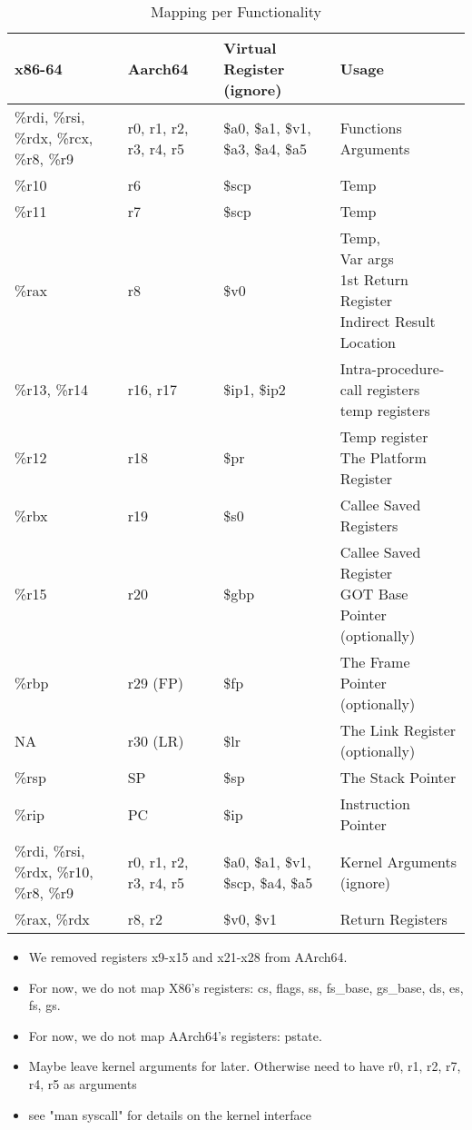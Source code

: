 \documentclass[11pt]{article}
\begin{document}
\begin{table}[ht]
\caption{Mapping per Functionality}
\begin{adjustwidth}{-4.3cm}{-4.3cm}
\begin{tabular}{|l|l|l|l|}
    \hline
    \textbf{x86-64} & \textbf{Aarch64} & \textbf{Virtual Register (ignore)} & \textbf{Usage} \\
    \hline
    \%rdi, \%rsi, \%rdx, \%rcx, \%r8, \%r9 & r0, r1, r2, r3, r4, r5 & \$a0, \$a1, \$v1, \$a3, \$a4, \$a5 & Functions Arguments \\
    \hline
    \%r10 & r6 & \$scp & Temp \\
    \hline
    \%r11 & r7 & \$scp & Temp \\
    \hline
    \%rax & r8 & \$v0 & \pbox{20cm}{Temp, \\  Var args \\ 1st Return Register \\ Indirect Result Location} \\
    \hline
    \%r13, \%r14 & r16, r17 & \$ip1, \$ip2 & \pbox{20cm}{Intra-procedure-call registers \\ temp registers} \\
    \hline
    \%r12 & r18 & \$pr & \pbox{20cm}{Temp register \\ The Platform Register} \\
    \hline
    \%rbx & r19 & \$s0 & Callee Saved Registers \\
    \hline
    \%r15 & r20 & \$gbp & \pbox{20cm}{Callee Saved Register \\ GOT Base Pointer (optionally)} \\
    \hline
    \%rbp & r29 (FP) & \$fp & The Frame Pointer (optionally) \\
    \hline
    NA & r30 (LR) & \$lr & The Link Register (optionally) \\
    \hline
    \%rsp & SP & \$sp & The Stack Pointer \\
    \hline
    \%rip & PC & \$ip & Instruction Pointer \\
    \hline
    \%rdi, \%rsi, \%rdx, \%r10, \%r8, \%r9 & r0, r1, r2, r3, r4, r5 & \$a0, \$a1, \$v1, \$scp, \$a4, \$a5 & Kernel Arguments (ignore)\\
    \hline
    \%rax, \%rdx & r8, r2 & \$v0, \$v1 & Return Registers \\
    \hline
\end{tabular}
\end{adjustwidth}\label{tab:mappings_per_func}
\end{table}

    \begin{itemize}
        \item We removed registers x9-x15 and x21-x28 from AArch64.
        \item For now, we do not map X86's registers: cs, flags, ss, fs\_base, gs\_base, ds, es, fs, gs.
        \item For now, we do not map AArch64's registers: pstate.
        \item Maybe leave kernel arguments for later.
        Otherwise need to have r0, r1, r2, r7, r4, r5 as arguments
        \item see "man syscall" for details on the kernel interface
    \end{itemize}
\end{document}
